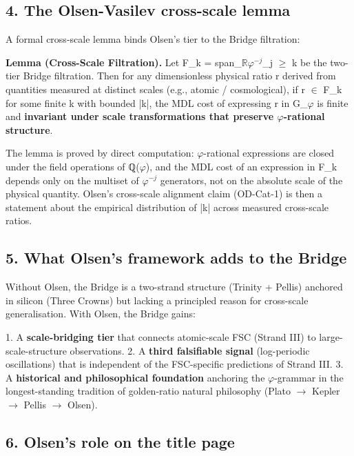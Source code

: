 \subsection{4. The Olsen-Vasilev cross-scale lemma}

A formal cross-scale lemma binds Olsen's tier to the Bridge filtration:

\textbf{Lemma (Cross-Scale Filtration).} Let F\_k = span\_$\mathbb{R}${$\varphi^{-j}$}\_{j $\geq$ k} be the two-tier Bridge filtration. Then for any dimensionless physical ratio r derived from quantities measured at distinct scales (e.g., atomic / cosmological), if r $\in$ F\_k for some finite k with bounded |k|, the MDL cost of expressing r in G\_$\varphi$ is finite and \textbf{invariant under scale transformations that preserve $\varphi$-rational structure}.

The lemma is proved by direct computation: $\varphi$-rational expressions are closed under the field operations of ℚ($\varphi$), and the MDL cost of an expression in F\_k depends only on the multiset of $\varphi^{-j}$ generators, not on the absolute scale of the physical quantity. Olsen's cross-scale alignment claim (OD-Cat-1) is then a statement about the empirical distribution of |k| across measured cross-scale ratios.

\subsection{5. What Olsen's framework adds to the Bridge}

Without Olsen, the Bridge is a two-strand structure (Trinity + Pellis) anchored in silicon (Three Crowns) but lacking a principled reason for cross-scale generalisation. With Olsen, the Bridge gains:

1. A \textbf{scale-bridging tier} that connects atomic-scale FSC (Strand III) to large-scale-structure observations.
2. A \textbf{third falsifiable signal} (log-periodic oscillations) that is independent of the FSC-specific predictions of Strand III.
3. A \textbf{historical and philosophical foundation} anchoring the $\varphi$-grammar in the longest-standing tradition of golden-ratio natural philosophy (Plato $\rightarrow$ Kepler $\rightarrow$ Pellis $\rightarrow$ Olsen).

\subsection{6. Olsen's role on the title page}

